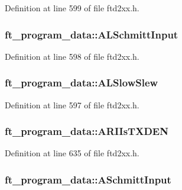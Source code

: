 Definition at line 599 of file ftd2xx.h.\hypertarget{structft__program__data_a1c6f11e949ab0c1ac413d8143b28f44b}{
\subsubsection[{ALSchmittInput}]{ {\bf ft\_\-program\_\-data::ALSchmittInput}}}
\label{structft__program__data_a1c6f11e949ab0c1ac413d8143b28f44b}


Definition at line 598 of file ftd2xx.h.\hypertarget{structft__program__data_a1a161ae5da233c198ace0e36bb6c7ffa}{
\subsubsection[{ALSlowSlew}]{ {\bf ft\_\-program\_\-data::ALSlowSlew}}}
\label{structft__program__data_a1a161ae5da233c198ace0e36bb6c7ffa}


Definition at line 597 of file ftd2xx.h.\hypertarget{structft__program__data_a0f63cc46538a3e21eba64f404ab4ae25}{
\subsubsection[{ARIIsTXDEN}]{ {\bf ft\_\-program\_\-data::ARIIsTXDEN}}}
\label{structft__program__data_a0f63cc46538a3e21eba64f404ab4ae25}


Definition at line 635 of file ftd2xx.h.\hypertarget{structft__program__data_a2cd876ddaa004af5561f546ee142ba5c}{
\subsubsection[{ASchmittInput}]{ {\bf ft\_\-program\_\-data::ASchmittInput}}}
\label{structft__program__data_a2cd876ddaa004af5561f546ee142ba5c}


